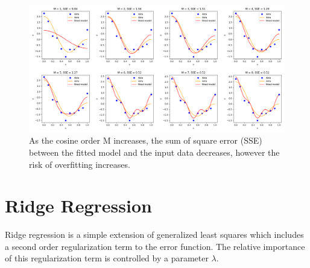 \documentclass[10pt]{article}
\begin{document}
\begin{figure}
\caption{As the cosine order M increases, the sum of square error (SSE) between the fitted model and the input data decreases, however the risk of overfitting increases.}
\begin{center}
\includegraphics[width=450px]{all_regress_cos}
\end{center}
\label{fig:cos_fitting}
\end{figure}

%

\section{Ridge Regression}

Ridge regression is a simple extension of generalized least squares which includes a second order regularization term to the error function. The relative importance of this regularization term is controlled by a parameter $\lambda$. 
\end{document}
